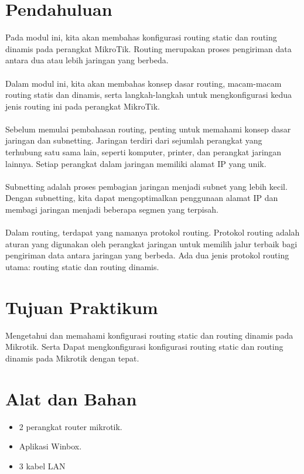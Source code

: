 \section{Pendahuluan}
Pada modul ini, kita akan membahas konfigurasi routing static dan routing dinamis pada perangkat
MikroTik. Routing merupakan proses pengiriman data antara dua atau lebih jaringan yang berbeda.
\\ \\ \indent Dalam modul ini, kita akan membahas konsep dasar routing, macam-macam routing statis dan dinamis, serta langkah-langkah untuk mengkonfigurasi kedua jenis routing ini pada perangkat MikroTik.
\\ \\ \indent Sebelum memulai pembahasan routing, penting untuk memahami konsep dasar jaringan dan subnetting. Jaringan terdiri dari sejumlah perangkat yang terhubung satu sama lain, seperti komputer,
printer, dan perangkat jaringan lainnya. Setiap perangkat dalam jaringan memiliki alamat IP yang unik.
\\ \\ \indent Subnetting adalah proses pembagian jaringan menjadi subnet yang lebih kecil. Dengan subnetting,
kita dapat mengoptimalkan penggunaan alamat IP dan membagi jaringan menjadi beberapa segmen
yang terpisah.
\\ \\ \indent Dalam routing, terdapat yang namanya protokol routing. Protokol routing adalah aturan yang digunakan oleh perangkat jaringan untuk memilih jalur terbaik bagi pengiriman data antara jaringan yang
berbeda. Ada dua jenis protokol routing utama: routing static dan routing dinamis.


\section{Tujuan Praktikum}
Mengetahui dan memahami konfigurasi routing static dan routing dinamis pada Mikrotik. Serta Dapat mengkonfigurasi konfigurasi routing static dan routing dinamis pada Mikrotik dengan tepat.

\section{Alat dan Bahan}
\begin{itemize}[label=$\bullet$, itemsep=-1pt, leftmargin=*]
	\item 2 perangkat router mikrotik.
	\item Aplikasi Winbox.
	\item 3 kabel LAN
\end{itemize}

